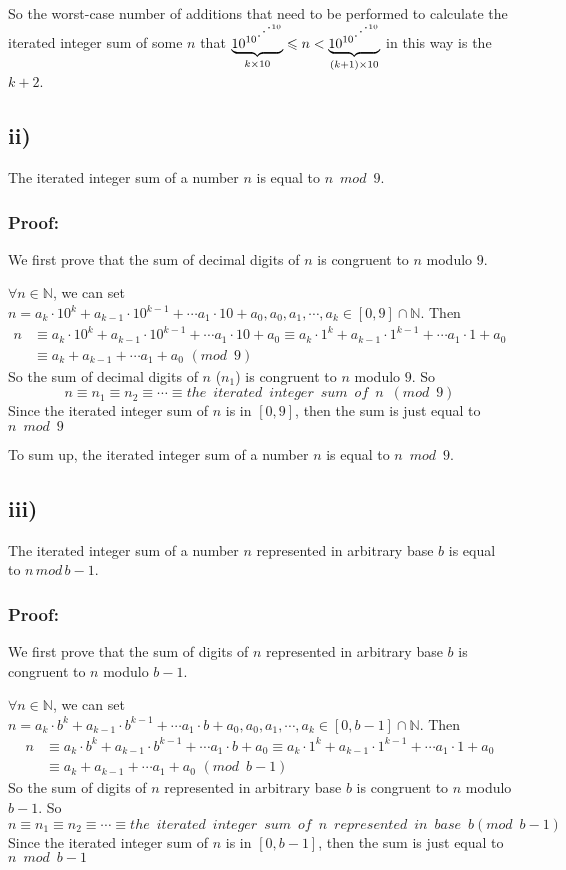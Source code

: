 \documentclass[a4paper,12pt,titlepage]{article}
\newcommand{\udots}{\mathinner{\mskip1mu\raise1pt\vbox{\kern7pt\hbox{.}}\mskip2mu\raise4pt\hbox{.}\mskip2mu\raise7pt\hbox{.}\mskip1mu}}
\begin{document}
So the worst-case number of additions that need to be performed to calculate the iterated integer sum
of some $n$ that $\underbrace{10^{10^{\udots^{10}}}}_{k\times 10}\leqslant n<\underbrace{10^{10^{\udots^{10}}}}_{(k+1)\times 10}$ in this way is the $k+2$.

\subsection*{ii)}
The iterated integer sum of a number $n$ is equal to $n\,\,\, mod\,\,\, 9$.
\subsubsection*{Proof:}
We first prove that the sum of decimal digits of $n$ is congruent to $n$ modulo $9$.

$\forall n\in\mathbb{N}$, we can set $n=a_k\cdot 10^k+a_{k-1}\cdot10^{k-1}+\cdots a_1\cdot 10 +a_0,a_0,a_1,\cdots,a_k\in[0,9]\cap\mathbb{N}$. Then
\begin{align*}
n&\equiv a_k\cdot 10^k+a_{k-1}\cdot10^{k-1}+\cdots a_1\cdot 10 +a_0\equiv a_k\cdot 1^k+a_{k-1}\cdot1^{k-1}+\cdots a_1\cdot 1 +a_0\\ 
&\equiv a_k+a_{k-1}+\cdots a_1 +a_0\,\,(mod\,\,\,9)
\end{align*}
So the sum of decimal digits of $n$ ($n_1$) is congruent to $n$ modulo $9$. So
$$n\equiv n_1\equiv n_2\equiv\cdots \equiv the\,\,\, iterated \,\,\,integer\,\,\, sum\,\,\, of\,\,\,n\,\,\,(mod\,\,\,9)$$
Since the iterated integer sum of $n$ is in $[0,9]$, then the sum is just equal to $n\,\,\,mod\,\,\,9$ 


To sum up, the iterated integer sum of a number $n$ is equal to $n\,\,\, mod\,\,\, 9$.

\subsection*{iii)}
The iterated integer sum of a number $n$ represented in arbitrary base $b$ is equal to $n\, mod\, b-1$.
\subsubsection*{Proof:}
We first prove that the sum of digits of $n$ represented in arbitrary base $b$ is congruent to $n$ modulo $b-1$.

$\forall n\in\mathbb{N}$, we can set $n=a_k\cdot b^k+a_{k-1}\cdot b^{k-1}+\cdots a_1\cdot b +a_0,a_0,a_1,\cdots,a_k\in[0,b-1]\cap\mathbb{N}$. Then
\begin{align*}
n&\equiv a_k\cdot b^k+a_{k-1}\cdot b^{k-1}+\cdots a_1\cdot b +a_0\equiv a_k\cdot 1^k+a_{k-1}\cdot1^{k-1}+\cdots a_1\cdot 1 +a_0\\ 
&\equiv a_k+a_{k-1}+\cdots a_1 +a_0\,\,(mod\,\,\,b-1)
\end{align*}
So the sum of digits of $n$ represented in arbitrary base $b$ is congruent to $n$ modulo $b-1$. So
$$n\equiv n_1\equiv n_2\equiv\cdots \equiv the\,\,\, iterated \,\,\,integer\,\,\, sum\,\,\, of\,\,\,n\,\,\,represented\,\,\, in\,\,\, base\,\,\,b(mod\,\,\,b-1)$$
Since the iterated integer sum of $n$ is in $[0,b-1]$, then the sum is just equal to $n\,\,\,mod\,\,\,b-1$ 
\end{document}
